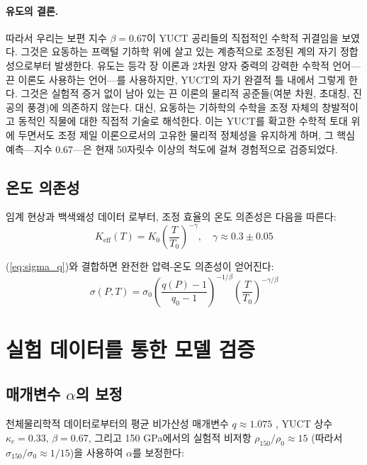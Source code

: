 \documentclass[11pt,a4paper]{article}
\newcommand{\Ke}{K_{\mathrm{eff}}}
\newcommand{\kappac}{\kappa_c}
\newcommand{\alp}{\alpha}
\theoremstyle{remark}
\begin{document}
	\paragraph{유도의 결론.}
	따라서 우리는 보편 지수 \(\beta = 0.67\)이 YUCT 공리들의 직접적인 수학적 귀결임을 보였다. 그것은 요동하는 프랙털 기하학 위에 살고 있는 계층적으로 조정된 계의 자기 정합성으로부터 발생한다. 유도는 등각 장 이론과 2차원 양자 중력의 강력한 수학적 언어—끈 이론도 사용하는 언어—를 사용하지만, YUCT의 자기 완결적 틀 내에서 그렇게 한다. 그것은 실험적 증거 없이 남아 있는 끈 이론의 물리적 공준들(여분 차원, 초대칭, 진공의 풍경)에 의존하지 않는다. 대신, 요동하는 기하학의 수학을 조정 자체의 창발적이고 동적인 직물에 대한 직접적 기술로 해석한다. 이는 YUCT를 확고한 수학적 토대 위에 두면서도 조정 제일 이론으로서의 고유한 물리적 정체성을 유지하게 하며, 그 핵심 예측—지수 \(0.67\)—은 현재 50자릿수 이상의 척도에 걸쳐 경험적으로 검증되었다.
	
	\subsection{온도 의존성}
	
	임계 현상과 백색왜성 데이터 \cite{appendixP}로부터, 조정 효율의 온도 의존성은 다음을 따른다:
	\begin{equation}
		\Ke(T) = K_0 \left( \frac{T}{T_0} \right)^{-\gamma}, \quad \gamma \approx 0.3 \pm 0.05
		\label{eq:keff_temp}
	\end{equation}
	
	(\ref{eq:sigma_q})와 결합하면 완전한 압력-온도 의존성이 얻어진다:
	\begin{equation}
		\sigma(P,T) = \sigma_0 \left( \frac{q(P)-1}{q_0-1} \right)^{-1/\beta} \left( \frac{T}{T_0} \right)^{-\gamma/\beta}
		\label{eq:sigma_PT}
	\end{equation}
	
	\section{실험 데이터를 통한 모델 검증}
	
	\subsection{매개변수 \(\alp\)의 보정}
	
	천체물리학적 데이터로부터의 평균 비가산성 매개변수 \(q \approx 1.075\) \cite{bertulani2015}, YUCT 상수 \(\kappac = 0.33\), \(\beta = 0.67\), 그리고 150 GPa에서의 실험적 비저항 \(\rho_{150}/\rho_0 \approx 15\) (따라서 \(\sigma_{150}/\sigma_0 \approx 1/15\))을 사용하여 \(\alp\)를 보정한다:
	
\end{document}
